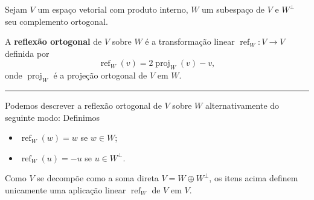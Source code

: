 \begin{definition}
	Sejam $V$ um espaço vetorial com produto interno, $W$ um subespaço de $V$ e $W^\perp$ seu complemento ortogonal.

	A \textbf{reflexão ortogonal} de $V$ sobre $W$ é a transformação linear $\operatorname{ref}_W\colon V\to V$ definida por
	\[\operatorname{ref}_W(v)= 2\operatorname{proj}_W(v)-v,\]
	onde $\operatorname{proj}_W$ é a projeção ortogonal de $V$ em $W$.

	\hrule

	Podemos descrever a reflexão ortogonal de $V$ sobre $W$ alternativamente do seguinte modo: Definimos
	\begin{itemize}
		\item $\operatorname{ref}_W(w)=w$ se $w\in W$;
		\item $\operatorname{ref}_W(u)=-u$ se $u\in W^\perp$.
	\end{itemize}
	
	Como $V$ se decompõe como a soma direta $V=W\oplus W^\perp$, os itens acima definem unicamente uma aplicação linear $\operatorname{ref}_W$ de $V$ em $V$.
\end{definition}